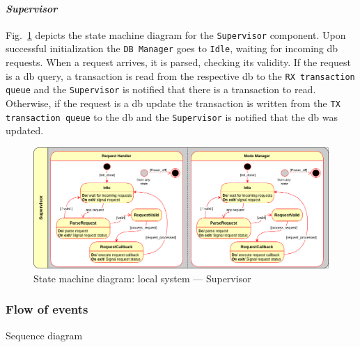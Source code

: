\paragraph{\emph{Supervisor}}
Fig.~\ref{fig:state-mach-local-superv} depicts the state machine diagram for the
\texttt{Supervisor} component.
Upon successful initialization the \texttt{DB Manager} goes to \texttt{Idle},
waiting for incoming \gls{db} requests.
When a request arrives, it is parsed, checking its validity. If the request is a
\gls{db} query, a transaction is read from the respective \gls{db} to the
\texttt{RX transaction queue} and the \texttt{Supervisor} is notified that there
is a transaction to read. Otherwise, if the request is a \gls{db} update
the transaction is written from the \texttt{TX transaction queue} to the
\gls{db} and the \texttt{Supervisor} is notified that the \gls{db} was updated.
%
\begin{figure}[htb!]
\centering
    \includegraphics[width=1.0\columnwidth]{./img/state-mach-local-superv.png}
  \caption{State machine diagram: local system --- Supervisor}%
\label{fig:state-mach-local-superv}
\end{figure}
%

\subsubsection{Flow of events}
\label{sec:flow-events}
Sequence diagram

